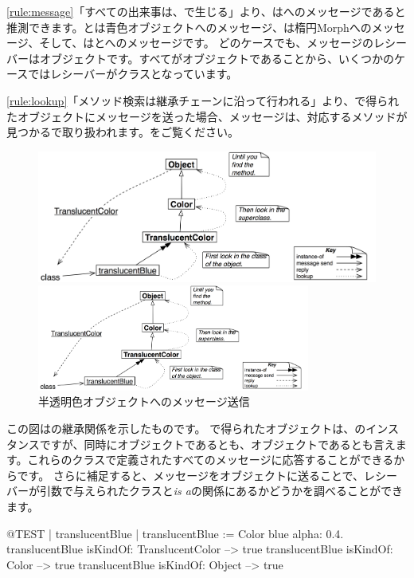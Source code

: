 \documentclass[a4paper,10pt,twoside]{book}
\begin{document}
\ref{rule:message}「すべての出来事は、で生じる」より、はへのメッセージであると推測できます。とは青色オブジェクトへのメッセージ、は楕円Morphへのメッセージ、そして、はとへのメッセージです。
どのケースでも、メッセージのレシーバーはオブジェクトです。すべてがオブジェクトであることから、いくつかのケースではレシーバーがクラスとなっています。

\ref{rule:lookup}「メソッド検索は継承チェーンに沿って行われる」より、で得られたオブジェクトにメッセージを送った場合、メッセージは、対応するメソッドが見つかるで取り扱われます。をご覧ください。

\begin{center}
\begin{figure}[!ht]
\ifluluelse
	{\centerline{\includegraphics[width=\textwidth]{TranslucentClassMessage}}}
	{\centerline{\includegraphics[width=0.8\textwidth]{TranslucentClassMessage}}}
\caption{半透明色オブジェクトへのメッセージ送信}
\end{figure}
\end{center}

この図はの継承関係を示したものです。
で得られたオブジェクトは、のインスタンスですが、同時にオブジェクトであるとも、オブジェクトであるとも言えます。これらのクラスで定義されたすべてのメッセージに応答することができるからです。
さらに補足すると、メッセージをオブジェクトに送ることで、レシーバーが引数で与えられたクラスと\emph{is a}の関係にあるかどうかを調べることができます。
\begin{code}{@TEST | translucentBlue |}
translucentBlue := Color blue alpha: 0.4.
translucentBlue isKindOf: TranslucentColor --> true
translucentBlue isKindOf: Color                    --> true
translucentBlue isKindOf: Object                  --> true
\end{code}
\end{document}
